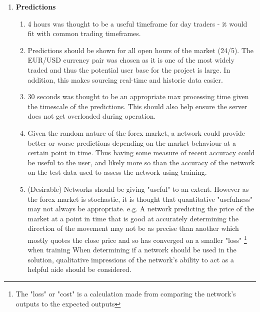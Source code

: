         \begin{enumerate}
            \item \textbf{Predictions} 
            
            \begin{enumerate}

                \item 4 hours was thought to be a useful timeframe for day traders - it would fit with common trading timeframes. \cite{forex_training_group}
                
                \item Predictions should be shown for all open hours of the market (24/5). The EUR/USD currency pair was chosen as it is one of the most widely traded and thus the potential user base for the project is large. In addition, this makes sourcing real-time and historic data easier.
                
                \item 30 seconds was thought to be an appropriate max processing time given the timescale of the predictions. This should also help ensure the server does not get overloaded during operation. 
                
                \item Given the random nature of the forex market, a network could provide better or worse predictions depending on the market behaviour at a certain point in time. Thus having some measure of recent accuracy could be useful to the user, and likely more so than the accuracy of the network on the test data used to assess the network using training.
            
                \item (Desirable) Networks should be giving "useful" to an extent. However as the forex market is stochastic, it is thought that quantitative "usefulness" may not always be appropriate. e.g. A network predicting the price of the market at a point in time that is good at accurately determining the direction of the movement may not be as precise than another which mostly quotes the close price and so has converged on a smaller "loss" \footnote{The "loss" or "cost" is a calculation made from comparing the network's outputs to the expected outputs} when training When determining if a network should be used in the solution, qualitative impressions of the network's ability to act as a helpful aide should be considered.

            \end{enumerate}
    

\end{enumerate}
